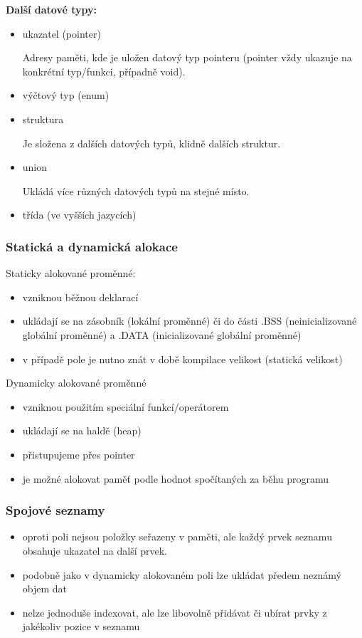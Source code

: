 \textbf{Další datové typy:}
\begin{itemize}
	\item ukazatel (pointer)
	
		Adresy paměti, kde je uložen datový typ pointeru (pointer vždy ukazuje na konkrétní typ/funkci, případně void).
		
	\item výčtový typ (enum)
	
	\item struktura
	
		Je složena z dalších datových typů, klidně dalších struktur.
		
	\item union
	
		Ukládá více různých datových typů na stejné místo.
		
	\item třída (ve vyšších jazycích)
	
\end{itemize}

\subsubsection*{Statická a dynamická alokace}
Staticky alokované proměnné:
\begin{itemize}
	\item vzniknou běžnou deklarací
	\item ukládají se na zásobník (lokální proměnné) či do části .BSS (neinicializované globální proměnné) a .DATA (inicializované globální proměnné)
	\item v případě pole je nutno znát v době kompilace velikost (statická velikost)
\end{itemize}

Dynamicky alokované proměnné
\begin{itemize}
	\item vzniknou použitím speciální funkcí/operátorem
	\item ukládají se na haldě (heap)
	\item přistupujeme přes pointer
	\item je možné alokovat paměť podle hodnot spočítaných za běhu programu
\end{itemize}

\subsubsection*{Spojové seznamy}
\begin{itemize}
	\item oproti poli nejsou položky seřazeny v paměti, ale každý prvek seznamu obsahuje ukazatel na další prvek.
	\item podobně jako v dynamicky alokovaném poli lze ukládat předem neznámý objem dat
	\item nelze jednoduše indexovat, ale lze libovolně přidávat či ubírat prvky z jakékoliv pozice v seznamu
\end{itemize}

